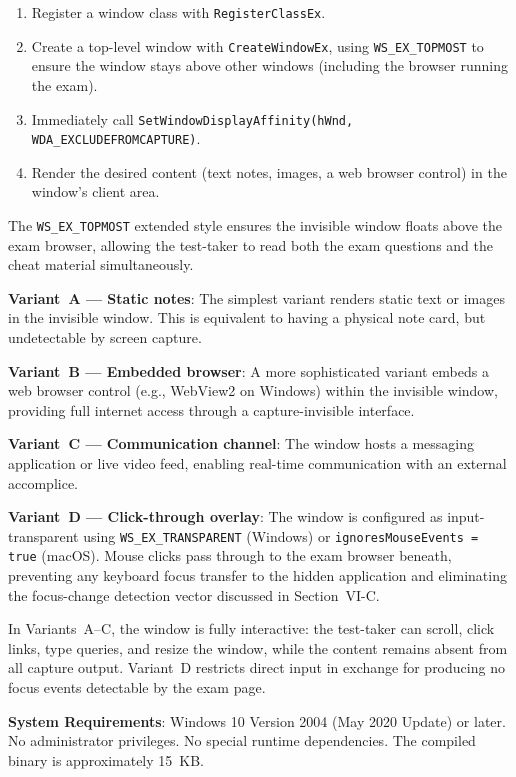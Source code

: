 \documentclass[conference]{IEEEtran}
\begin{document}
\begin{enumerate}
\item Register a window class with \texttt{RegisterClassEx}.
\item Create a top-level window with \texttt{CreateWindowEx}, using \texttt{WS\_EX\_TOPMOST} to ensure the window stays above other windows (including the browser running the exam).
\item Immediately call \texttt{SetWindowDisplayAffinity(\allowbreak{}hWnd, WDA\_EXCLUDEFROMCAPTURE)}.
\item Render the desired content (text notes, images, a web browser control) in the window's client area.
\end{enumerate}

The \texttt{WS\_EX\_TOPMOST} extended style ensures the invisible window floats above the exam browser, allowing the test-taker to read both the exam questions and the cheat material simultaneously.

\textbf{Variant~A --- Static notes}: The simplest variant renders static text or images in the invisible window. This is equivalent to having a physical note card, but undetectable by screen capture.

\textbf{Variant~B --- Embedded browser}: A more sophisticated variant embeds a web browser control (e.g., WebView2 on Windows) within the invisible window, providing full internet access through a capture-invisible interface.

\textbf{Variant~C --- Communication channel}: The window hosts a messaging application or live video feed, enabling real-time communication with an external accomplice.

\textbf{Variant~D --- Click-through overlay}: The window is configured as input-transparent using \texttt{WS\_EX\_TRANSPARENT} (Windows) or \texttt{ignoresMouseEvents = true} (macOS). Mouse clicks pass through to the exam browser beneath, preventing any keyboard focus transfer to the hidden application and eliminating the focus-change detection vector discussed in Section~VI-C.

In Variants~A--C, the window is fully interactive: the test-taker can scroll, click links, type queries, and resize the window, while the content remains absent from all capture output. Variant~D restricts direct input in exchange for producing no focus events detectable by the exam page.

\textbf{System Requirements}: Windows 10 Version 2004 (May 2020 Update) or later. No administrator privileges. No special runtime dependencies. The compiled binary is approximately 15~KB.
\end{document}
